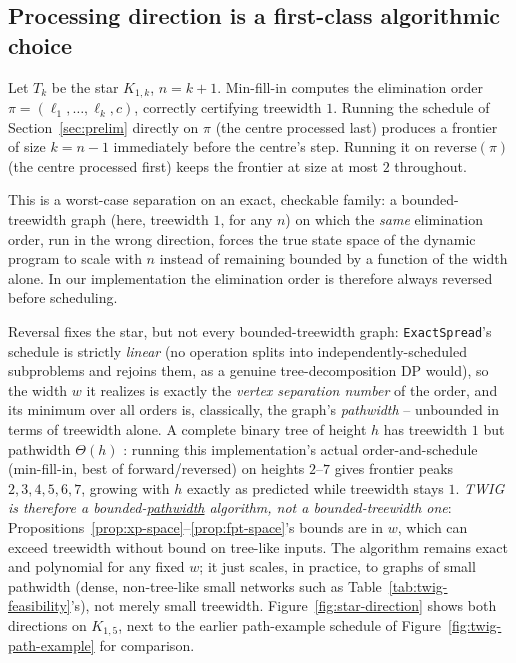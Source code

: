\documentclass[ASNA,number]{USG}
\begin{document}
\subsection{Processing direction is a first-class algorithmic choice}\label{sec:twig-direction}

\begin{proposition}\label{prop:direction}
Let $T_k$ be the star $K_{1,k}$, $n=k+1$. Min-fill-in computes the
elimination order $\pi=(\ell_1,\dots,\ell_k,c)$, correctly certifying
treewidth $1$. Running the schedule of Section~\ref{sec:prelim} directly on
$\pi$ (the centre processed last) produces a frontier of size $k=n-1$
immediately before the centre's step. Running it on $\mathrm{reverse}(\pi)$
(the centre processed first) keeps the frontier at size at most $2$
throughout.
\end{proposition}

This is a worst-case separation on an exact, checkable family: a
bounded-treewidth graph (here, treewidth $1$, for any $n$) on which the
\emph{same} elimination order, run in the wrong direction, forces the true
state space of the dynamic program to scale with $n$ instead of remaining
bounded by a function of the width alone. In our implementation the
elimination order is therefore always reversed before scheduling.

Reversal fixes the star, but not every bounded-treewidth graph:
\texttt{ExactSpread}'s schedule is strictly \emph{linear} (no operation
splits into independently-scheduled subproblems and rejoins them, as a
genuine tree-decomposition DP would), so the width $w$ it realizes is
exactly the \emph{vertex separation number} of the order, and its minimum
over all orders is, classically, the graph's \emph{pathwidth}
\citep{kinnersley1992} -- unbounded in terms of treewidth alone. A
complete binary tree of height $h$ has treewidth $1$ but pathwidth
$\Theta(h)$ \citep{kinnersley1992}: running this implementation's actual
order-and-schedule (min-fill-in, best of forward/reversed) on heights
$2$--$7$ gives frontier peaks $2,3,4,5,6,7$, growing with $h$ exactly as
predicted while treewidth stays $1$. \emph{TWIG is therefore a
bounded-\underline{pathwidth} algorithm, not a bounded-treewidth one}:
Propositions~\ref{prop:xp-space}--\ref{prop:fpt-space}'s bounds are in
$w$, which can exceed treewidth without bound on tree-like inputs. The
algorithm remains exact and polynomial for any fixed $w$; it just scales,
in practice, to graphs of small pathwidth (dense, non-tree-like small
networks such as Table~\ref{tab:twig-feasibility}'s), not merely small
treewidth.
Figure~\ref{fig:star-direction} shows both directions on $K_{1,5}$, next
to the earlier path-example schedule of Figure~\ref{fig:twig-path-example}
for comparison.
\end{document}
